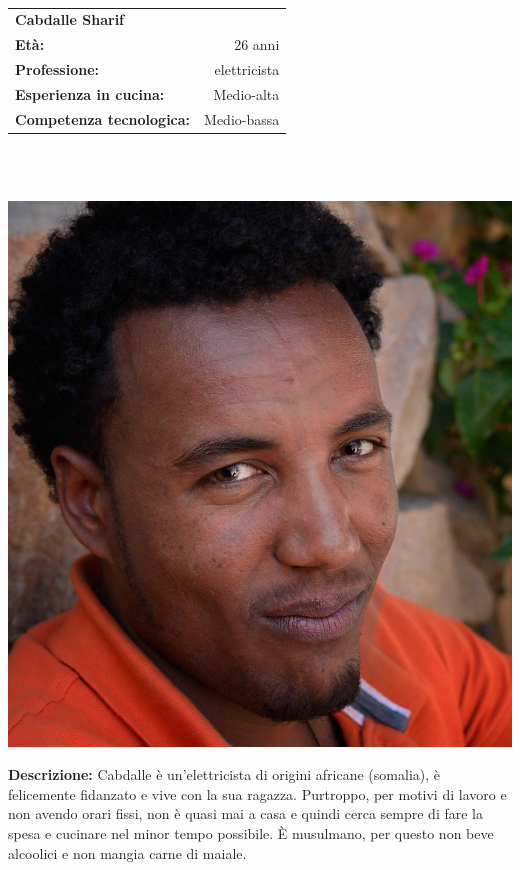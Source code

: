 \hrulefill\\
\begin{minipage}{.75\textwidth}
\begin{tabular}{l | r}
	\textbf{Cabdalle Sharif} & \\
	\textbf{Età:} & 26 anni\\
	\textbf{Professione:} & elettricista\\
	\textbf{Esperienza in cucina:} & Medio-alta\\
	\textbf{Competenza tecnologica:} & Medio-bassa\\
\end{tabular}\\\\
\end{minipage}
\begin{minipage}{.24\textwidth}
	\includegraphics[width=\textwidth]{img/personas/cabdalle}
\end{minipage}
	\textbf{Descrizione:}
	Cabdalle è un'elettricista di origini africane (somalia), è felicemente
	fidanzato e vive con la sua ragazza. Purtroppo, per motivi di lavoro e
	non avendo orari fissi, non è quasi mai a casa e quindi cerca sempre di
	fare la spesa e cucinare nel minor tempo possibile.  È musulmano, per
	questo non beve alcoolici e non mangia carne di maiale.

